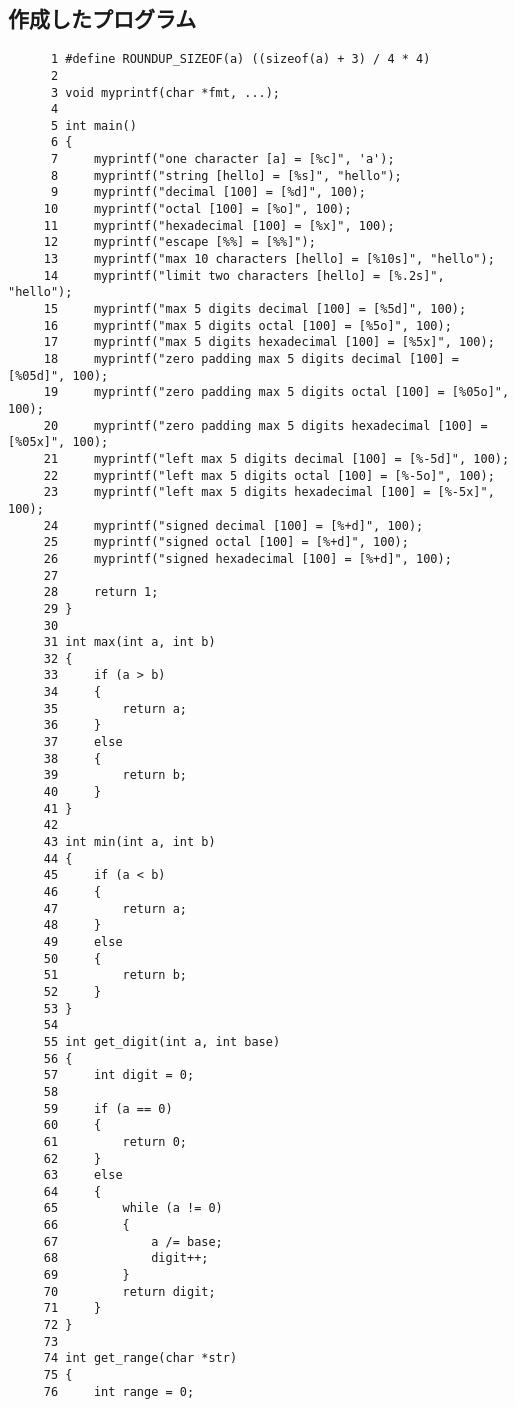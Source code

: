 \documentclass[a4j,11pt]{jarticle}
\begin{document}
\subsection{作成したプログラム}\label{sec:sourcecode}
\begin{verbatim}
      1	#define ROUNDUP_SIZEOF(a) ((sizeof(a) + 3) / 4 * 4)
      2	
      3	void myprintf(char *fmt, ...);
      4	
      5	int main()
      6	{
      7	    myprintf("one character [a] = [%c]", 'a');
      8	    myprintf("string [hello] = [%s]", "hello");
      9	    myprintf("decimal [100] = [%d]", 100);
     10	    myprintf("octal [100] = [%o]", 100);
     11	    myprintf("hexadecimal [100] = [%x]", 100);
     12	    myprintf("escape [%%] = [%%]");
     13	    myprintf("max 10 characters [hello] = [%10s]", "hello");
     14	    myprintf("limit two characters [hello] = [%.2s]", "hello");
     15	    myprintf("max 5 digits decimal [100] = [%5d]", 100);
     16	    myprintf("max 5 digits octal [100] = [%5o]", 100);
     17	    myprintf("max 5 digits hexadecimal [100] = [%5x]", 100);
     18	    myprintf("zero padding max 5 digits decimal [100] = [%05d]", 100);
     19	    myprintf("zero padding max 5 digits octal [100] = [%05o]", 100);
     20	    myprintf("zero padding max 5 digits hexadecimal [100] = [%05x]", 100);
     21	    myprintf("left max 5 digits decimal [100] = [%-5d]", 100);
     22	    myprintf("left max 5 digits octal [100] = [%-5o]", 100);
     23	    myprintf("left max 5 digits hexadecimal [100] = [%-5x]", 100);
     24	    myprintf("signed decimal [100] = [%+d]", 100);
     25	    myprintf("signed octal [100] = [%+d]", 100);
     26	    myprintf("signed hexadecimal [100] = [%+d]", 100);
     27	
     28	    return 1;
     29	}
     30	
     31	int max(int a, int b)
     32	{
     33	    if (a > b)
     34	    {
     35	        return a;
     36	    }
     37	    else
     38	    {
     39	        return b;
     40	    }
     41	}
     42	
     43	int min(int a, int b)
     44	{
     45	    if (a < b)
     46	    {
     47	        return a;
     48	    }
     49	    else
     50	    {
     51	        return b;
     52	    }
     53	}
     54	
     55	int get_digit(int a, int base)
     56	{
     57	    int digit = 0;
     58	
     59	    if (a == 0)
     60	    {
     61	        return 0;
     62	    }
     63	    else
     64	    {
     65	        while (a != 0)
     66	        {
     67	            a /= base;
     68	            digit++;
     69	        }
     70	        return digit;
     71	    }
     72	}
     73	
     74	int get_range(char *str)
     75	{
     76	    int range = 0;

\end{verbatim}
\end{document}
